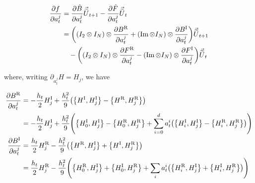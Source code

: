 \documentclass{article}
\newcommand{\isoU}{\widetilde{U}}
\newcommand{\isovecU}{\vec{\widetilde{U}}}
\newcommand{\isovec}{\text{isovec}}
\newcommand{\HI}{H^{\text{I}}}
\newcommand{\HR}{H^{\text{R}}}
\newcommand{\BR}{B^{\text{R}}}
\newcommand{\BI}{B^{\text{I}}}
\newcommand{\FR}{F^{\text{R}}}
\newcommand{\FI}{F^{\text{I}}}
\newcommand{\UR}{U^{\text{R}}}
\newcommand{\UI}{U^{\text{I}}}
\begin{document}
\begin{align*}
  \pdv{f}{a^j_t} %
  &= \pdv{\hat B}{a^j_t} \isovecU_{t+1} - \pdv{\hat F}{a^j_t} \isovecU_{t} \\
  &= \qty((I_2 \otimes I_N) \otimes \pdv{\BR}{a^j_t} + (\Im \otimes I_N) \otimes \pdv{\BI}{a^j_t}) \isovecU_{t+1} \\
  & \quad - \qty((I_2 \otimes I_N) \otimes \pdv{\FR}{a^j_t} - (\Im \otimes I_N) \otimes \pdv{\FI}{a^j_t}) \isovecU_{t} 
\end{align*}

where, writing $\partial_{a^j_t} H = H_j$, we have 

\begin{align*}
  \pdv{\BR}{a^j_t} &= -\frac{h_t}{2} \HI_j + \frac{h_t^2}{9} \qty(\qty{\HI,\HI_j} - \qty{\HR, \HR_j}) \\
  &= -\frac{h_t}{2} \HI_j + \frac{h_t^2}{9} \qty(\qty{\HI_0, \HI_j} - \qty{\HR_0, \HR_j} + \sum_{i=0}^d a^i_t \qty(\qty{\HI_i, \HI_j} - \qty{\HR_i, \HR_j})) \\
  \pdv{\BI}{a^j_t} &= \frac{h_t}{2} \HR_j - \frac{h_t^2}{9} \qty(\qty{\HR,\HI_j} + \qty{\HI,\HR_j}) \\
  &= \frac{h_t}{2} \HR_j - \frac{h_t^2}{9} \qty(\qty{\HR_0,\HI_j} + \qty{\HI_0,\HR_j} + \sum_i a^i_t \qty(\qty{\HR_i,\HI_j} + \qty{\HI_i,\HR_j})) \\
\end{align*}
\end{document}
